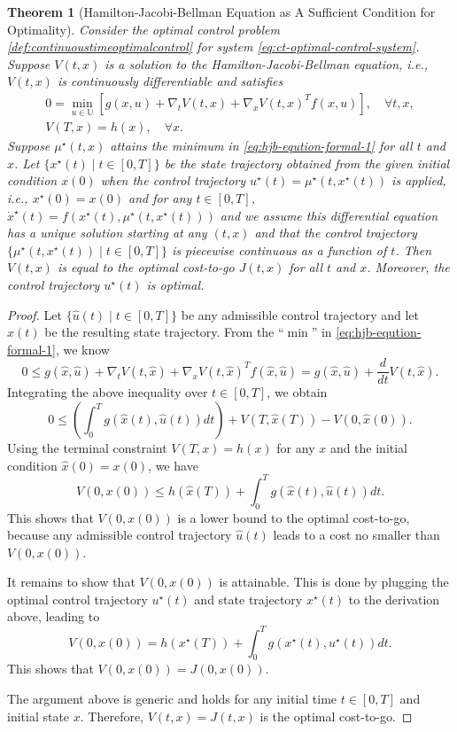 \documentclass[
]{book}
\newtheorem{theorem}{Theorem}[chapter]
\theoremstyle{definition}
\theoremstyle{definition}
\theoremstyle{definition}
\theoremstyle{definition}
\theoremstyle{remark}
\begin{document}
\begin{theorem}[Hamilton-Jacobi-Bellman Equation as A Sufficient Condition for Optimality]
\protect\hypertarget{thm:hjbsufficient}{}\label{thm:hjbsufficient}Consider the optimal control problem \ref{def:continuoustimeoptimalcontrol} for system \eqref{eq:ct-optimal-control-system}. Suppose \(V(t,x)\) is a solution to the Hamilton-Jacobi-Bellman equation, i.e., \(V(t,x)\) is continuously differentiable and satisfies
\begin{align}
\label{eq:hjb-eqution-formal-1}
0 = \min_{u \in \mathbb{U}} \left[ g(x,u) + \nabla_t V(t,x) + \nabla_x V(t,x)^T f(x,u)\right], \quad \forall t,x, \\
V(T,x) = h(x), \quad \forall x.
\end{align}
Suppose \(\mu^\star(t,x)\) attains the minimum in \eqref{eq:hjb-eqution-formal-1} for all \(t\) and \(x\). Let \(\{x^\star(t) \mid t \in [0,T] \}\) be the state trajectory obtained from the given initial condition \(x(0)\) when the control trajectory \(u^\star(t) = \mu^\star(t,x^\star(t))\) is applied, i.e., \(x^\star(0) = x(0)\) and for any \(t \in [0,T]\), \(\dot{x}^\star(t) = f(x^\star(t), \mu^\star(t,x^\star(t)))\) and we assume this differential equation has a unique solution starting at any \((t,x)\) and that the control trajectory \(\{ \mu^\star(t,x^\star(t)) \mid t \in [0,T] \}\) is piecewise continuous as a function of \(t\).
Then \(V(t,x)\) is equal to the optimal cost-to-go \(J(t,x)\) for all \(t\) and \(x\). Moreover, the control trajectory \(u^\star(t)\) is optimal.
\end{theorem}

\begin{proof}
Let \(\{\hat{u}(t) \mid t \in [0,T] \}\) be any admissible control trajectory and let \(\hat{x}(t)\) be the resulting state trajectory. From the ``\(\min\)'' in \eqref{eq:hjb-eqution-formal-1}, we know
\[
0 \leq g(\hat{x},\hat{u}) + \nabla_t V(t,\hat{x}) + \nabla_x V(t,\hat{x})^T f(\hat{x},\hat{u}) = g(\hat{x},\hat{u}) + \frac{d}{dt} V(t,\hat{x}).
\]
Integrating the above inequality over \(t \in [0,T]\), we obtain
\[
0 \leq \left( \int_{0}^T g(\hat{x}(t),\hat{u}(t))dt \right) + V(T,\hat{x}(T)) - V(0,\hat{x}(0)).
\]
Using the terminal constraint \(V(T,x) = h(x)\) for any \(x\) and the initial condition \(\hat{x}(0) = x(0)\), we have
\[
V(0,x(0)) \leq h(\hat{x}(T)) + \int_{0}^T g(\hat{x}(t),\hat{u}(t)) dt.
\]
This shows that \(V(0,x(0))\) is a lower bound to the optimal cost-to-go, because any admissible control trajectory \(\hat{u}(t)\) leads to a cost no smaller than \(V(0,x(0))\).

It remains to show that \(V(0,x(0))\) is attainable. This is done by plugging the optimal control trajectory \(u^\star(t)\) and state trajectory \(x^\star(t)\) to the derivation above, leading to
\[
V(0,x(0)) = h(x^\star(T)) + \int_0^T g(x^\star(t),u^\star(t)) dt.
\]
This shows that \(V(0,x(0)) = J(0,x(0))\).

The argument above is generic and holds for any initial time \(t \in [0,T]\) and initial state \(x\). Therefore, \(V(t,x) = J(t,x)\) is the optimal cost-to-go.
\end{proof}
\end{document}
